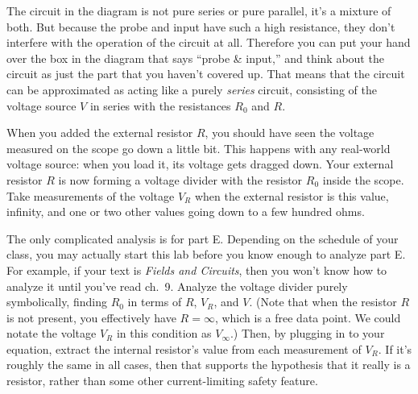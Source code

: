 
The circuit in the diagram is not pure series or pure parallel, it's a mixture of both.
But because the probe and input have such a high resistance, they don't interfere with
the operation of the circuit at all. Therefore you can put your hand over the box in
the diagram that says ``probe \& input,'' and think about the circuit as just the
part that you haven't covered up. That means that the circuit can be approximated as acting like a purely
\emph{series} circuit, consisting of the voltage source $V$ in series with the resistances
$R_0$ and $R$.

When you added the external resistor $R$, you should have seen the voltage measured on the scope go
down a little bit. This happens with any real-world voltage source: when you load it,
its voltage gets dragged down. Your external resistor $R$ is now forming a voltage divider
with the resistor $R_0$ inside the scope. Take measurements of the voltage $V_R$ when the external
resistor is this value, infinity, and one or two other values going down to a few hundred
ohms.

\analysis

The only complicated analysis is for part E. Depending on the schedule of your class,
you may actually start this lab before you know enough to analyze part E. For example, if
your text is \emph{Fields and Circuits}, then you won't know how to analyze it until
you've read ch.~9.
Analyze the voltage divider purely symbolically, finding
$R_0$ in terms of $R$, $V_R$, and $V$. (Note that when the resistor $R$ is not present,
you effectively have $R=\infty$, which is a free data point. We could notate the
voltage $V_R$ in this condition as $V_\infty$.)
Then, by plugging in to your equation, extract the internal resistor's value from each
measurement of $V_R$. If it's roughly the same in all cases, then that supports the hypothesis that it
really is a resistor, rather than some other current-limiting safety feature.
